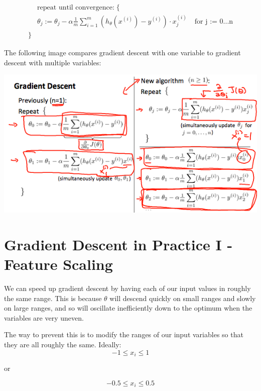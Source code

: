 \documentclass[10pt,a4paper,UTF8]{article}
\begin{document}
\begin{align*}& \text{repeat until convergence:} \; \lbrace \\ \; & \theta_j := \theta_j - \alpha \frac{1}{m} \sum\limits_{i=1}^{m} (h_\theta(x^{(i)}) - y^{(i)}) \cdot x_j^{(i)} \; & \text{for j := 0...n}\\ \rbrace\end{align*}

The following image compares gradient descent with one variable to gradient descent with multiple variables:

\begin{center}
\includegraphics[width=.9\linewidth]{../../img/computer_ng/20171006multivariateLRCostFunction.png}
\end{center}

\section{Gradient Descent in Practice I - Feature Scaling}
\label{sec:org1facdbe}


We can speed up gradient descent by having each of our input values in roughly the same range. This is because \(\theta\) will descend quickly on small ranges and slowly on large ranges, and so will oscillate inefficiently down to the optimum when the variables are very uneven.


The way to prevent this is to modify the ranges of our input variables so that they are all roughly the same. Ideally:
\begin{equation}
\label{eq:2}
-1 \leq x_{i} \leq 1
\end{equation}

or

\begin{equation}
\label{eq:3}
-0.5 \leq x_{i} \leq 0.5
\end{equation}
\end{document}
